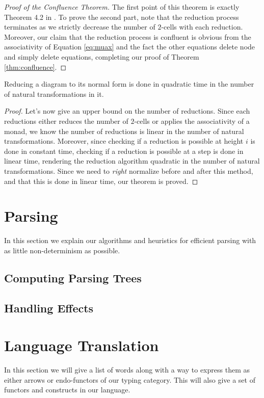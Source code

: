 \documentclass[math, english, info]{cours}
\begin{document}
\begin{proof}[Proof of the Confluence Theorem]
	The first point of this theorem is exactly Theorem 4.2
	in .
	To prove the second part, note that the reduction process terminates as
	we strictly decrease the number of $2$-cells with each reduction.
	Moreover, our claim that the reduction process is confluent is obvious
	from the associativity of Equation \eqref{eq:muax} and the fact the other
	equations delete node and simply delete equations, completing our proof
	of Theorem \ref{thm:confluence}.
\end{proof}


\begin{thm}
	Reducing a diagram to its normal form is done in quadratic time in
	the number of natural transformations in it.
\end{thm}
\begin{proof}
	Let's now give an upper bound on the number of reductions.
	Since each reductions either reduces the number of $2$-cells or applies the
	associativity of a monad, we know the number of reductions is linear in the
	number of natural transformations.
	Moreover, since checking if a reduction is possible at height $i$ is done in
	constant time, checking if a reduction is possible at a step is done in
	linear time, rendering the reduction algorithm quadratic in the number of
	natural transformations.
	Since we need to \emph{right} normalize before and after this method, and
	that this is done in linear time, our theorem is proved.
\end{proof}

\section{Parsing}\label{sec:parsing}
In this section we explain our algorithms and heuristics for efficient parsing with as little non-determinism as possible.

\subsection{Computing Parsing Trees}


\subsection{Handling Effects}
\section{Language Translation}
\label{sec:language}
In this section we will give a list of words along with a way to express them as either arrows or endo-functors of our typing category.
This will also give a set of functors and constructs in our language.
\end{document}
